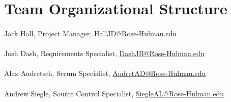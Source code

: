 \section{Team Organizational Structure}
\paragraph{} Jack Hall, Project Manager, \href{mailto:halljd@rose-hulman.edu}{HallJD@Rose-Hulman.edu}
\paragraph{} Josh Dash, Requirements Specialist, \href{mailto:dashjb@rose-hulman.edu}{DashJB@Rose-Hulman.edu}
\paragraph{} Alex Audretsch, Scrum Specialist, \href{mailto:audretad@rose-hulman.edu}{AudretAD@Rose-Hulman.edu}
\paragraph{}Andrew Siegle, Source Control Specialist, \href{mailto:siegleal@rose-hulman.edu}{SiegleAL@Rose-Hulman.edu}
